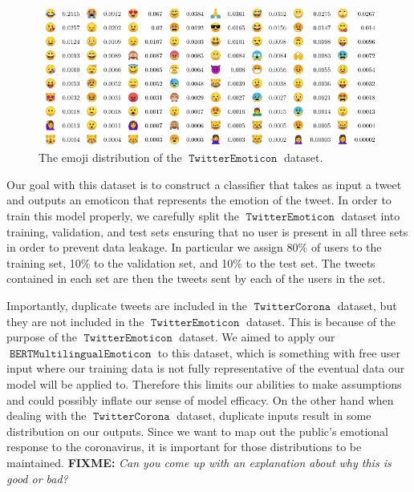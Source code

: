 \documentclass[11pt]{article}
\newcommand{\fixme}[1]{{\color{red} \textbf{FIXME:} {\textit {#1}}}}
\DeclareMathOperator{\model}{\texttt{BERTMultilingualEmoticon}}
\DeclareMathOperator{\emoticon}{\texttt{TwitterEmoticon}}
\DeclareMathOperator{\corona}{\texttt{TwitterCorona}}
\begin{document}
\begin{figure}[ht]
    \centering
    \includegraphics[scale = 1.2]{images/emojitable.pdf}
    \caption{The emoji distribution of the $\emoticon$ dataset.} 
    \label{table:lang}
\end{figure}






Our goal with this dataset is to construct a classifier that takes as input a tweet and outputs an emoticon that represents the emotion of the tweet.
In order to train this model properly,
we carefully split the $\emoticon$ dataset into training, validation, and test sets ensuring that no user is present in all three sets in order to prevent data leakage.
In particular we assign 80\% of users to the training set, 10\% to the validation set, and 10\% to the test set.
The tweets contained in each set are then the tweets sent by each of the users in the set.

Importantly, duplicate tweets are included in the $\corona$ dataset,
but they are not included in the $\emoticon$ dataset.
This is because of the purpose of the $\emoticon$ dataset. 
We aimed to apply our $\model$ to this dataset,
which is something with free user input where our training data is not fully representative of the eventual data our model will be applied to.
Therefore this limits our abilities to make assumptions and could possibly inflate our sense of model efficacy.
On the other hand when dealing with the $\corona$ dataset,
duplicate inputs result in some distribution on our outputs.
Since we want to map out the public's emotional response to the coronavirus, it is important 
for those distributions to be maintained.
\fixme{Can you come up with an explanation about why this is good or bad?}
\end{document}
